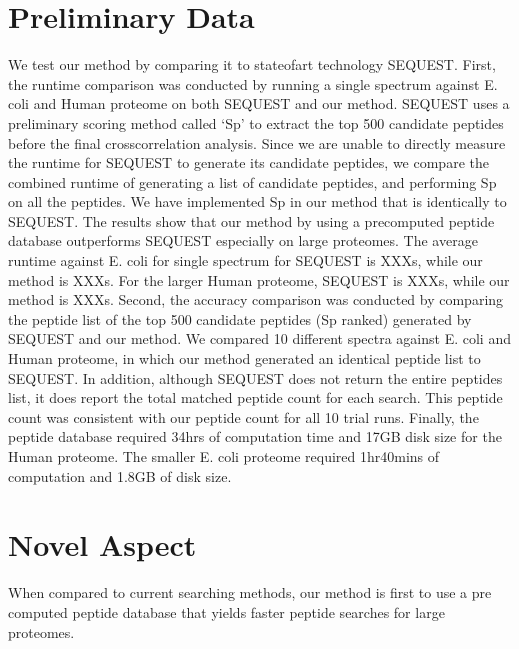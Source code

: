 \documentclass{article}
\begin{document}
\section{Preliminary Data}

We test our method by comparing it to stateofart technology
SEQUEST. First, the  runtime comparison was conducted by running a
single spectrum against E. coli and  Human proteome on both SEQUEST
and our method. SEQUEST uses a preliminary  scoring method called `Sp'
to extract the top 500 candidate peptides before the final
crosscorrelation analysis. Since we are unable to directly measure the
runtime for SEQUEST to generate its candidate peptides, we compare the
combined runtime of  generating a list of candidate peptides, and
performing Sp on all the peptides. We have  implemented Sp in our
method that is identically to SEQUEST. The results show that  our
method by using a precomputed peptide database outperforms SEQUEST
especially on large proteomes. The average runtime against E. coli for
single spectrum  for SEQUEST is XXXs, while our method is XXXs. For
the larger Human proteome,  SEQUEST is XXXs, while our method is XXXs.
Second, the accuracy comparison was conducted by comparing the peptide
list of  the top 500 candidate peptides (Sp ranked) generated by
SEQUEST and our method.  We compared 10 different spectra against
E. coli and Human proteome, in which our  method generated an
identical peptide list to SEQUEST. In addition, although  SEQUEST does
not return the entire peptides list, it does report the total matched
peptide count for each search. This peptide count was consistent with
our peptide  count for all 10 trial runs. Finally, the peptide
database required 34hrs of computation time and 17GB disk  size for
the Human proteome. The smaller E. coli proteome required 1hr40mins of
computation and 1.8GB of disk size.

\section{Novel Aspect}

When compared to current searching methods, our method is first to use
a pre computed peptide database that yields faster peptide searches
for large proteomes.
\end{document}
